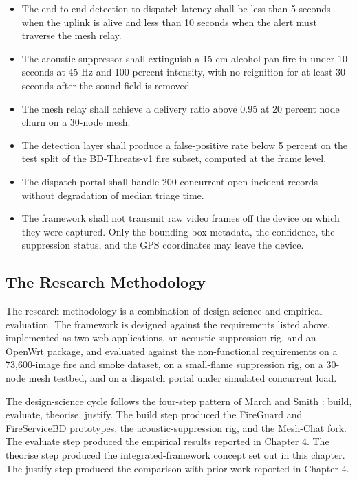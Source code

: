 \begin{itemize}
\item The end-to-end detection-to-dispatch latency shall be less than 5 seconds when the uplink is alive and less than 10 seconds when the alert must traverse the mesh relay.
\item The acoustic suppressor shall extinguish a 15-cm alcohol pan fire in under 10 seconds at 45 Hz and 100 percent intensity, with no reignition for at least 30 seconds after the sound field is removed.
\item The mesh relay shall achieve a delivery ratio above 0.95 at 20 percent node churn on a 30-node mesh.
\item The detection layer shall produce a false-positive rate below 5 percent on the test split of the BD-Threats-v1 fire subset, computed at the frame level.
\item The dispatch portal shall handle 200 concurrent open incident records without degradation of median triage time.
\item The framework shall not transmit raw video frames off the device on which they were captured. Only the bounding-box metadata, the confidence, the suppression status, and the GPS coordinates may leave the device.
\end{itemize}

\subsection{The Research Methodology}

The research methodology is a combination of design science and empirical evaluation. The framework is designed against the requirements listed above, implemented as two web applications, an acoustic-suppression rig, and an OpenWrt package, and evaluated against the non-functional requirements on a 73{,}600-image fire and smoke dataset, on a small-flame suppression rig, on a 30-node mesh testbed, and on a dispatch portal under simulated concurrent load.

The design-science cycle follows the four-step pattern of March and Smith \cite{marchsmith1995}: build, evaluate, theorise, justify. The build step produced the FireGuard and FireServiceBD prototypes, the acoustic-suppression rig, and the Mesh-Chat fork. The evaluate step produced the empirical results reported in Chapter 4. The theorise step produced the integrated-framework concept set out in this chapter. The justify step produced the comparison with prior work reported in Chapter 4.


